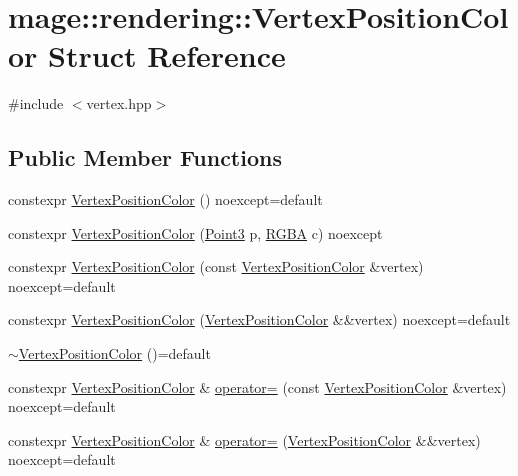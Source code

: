 \hypertarget{structmage_1_1rendering_1_1_vertex_position_color}{}\section{mage\+:\+:rendering\+:\+:Vertex\+Position\+Color Struct Reference}
\label{structmage_1_1rendering_1_1_vertex_position_color}


{\ttfamily \#include $<$vertex.\+hpp$>$}

\subsection*{Public Member Functions}
\begin{DoxyCompactItemize}
\item 
constexpr \hyperlink{structmage_1_1rendering_1_1_vertex_position_color_a2491463aecd8969ed33f85b41a0887c5}{Vertex\+Position\+Color} () noexcept=default
\item 
constexpr \hyperlink{structmage_1_1rendering_1_1_vertex_position_color_aee4b12660a3966ebbaf8235eadf0295a}{Vertex\+Position\+Color} (\hyperlink{structmage_1_1_point3}{Point3} p, \hyperlink{structmage_1_1_r_g_b_a}{R\+G\+BA} c) noexcept
\item 
constexpr \hyperlink{structmage_1_1rendering_1_1_vertex_position_color_a4722da066079b70dea70bf892b0652ad}{Vertex\+Position\+Color} (const \hyperlink{structmage_1_1rendering_1_1_vertex_position_color}{Vertex\+Position\+Color} \&vertex) noexcept=default
\item 
constexpr \hyperlink{structmage_1_1rendering_1_1_vertex_position_color_a28e3b4bc9f98e805fc2bfd0553876e15}{Vertex\+Position\+Color} (\hyperlink{structmage_1_1rendering_1_1_vertex_position_color}{Vertex\+Position\+Color} \&\&vertex) noexcept=default
\item 
\hyperlink{structmage_1_1rendering_1_1_vertex_position_color_a80120768659e011119843c29df379e13}{$\sim$\+Vertex\+Position\+Color} ()=default
\item 
constexpr \hyperlink{structmage_1_1rendering_1_1_vertex_position_color}{Vertex\+Position\+Color} \& \hyperlink{structmage_1_1rendering_1_1_vertex_position_color_a8fd53bb8cda2b18504a7dfd386e78463}{operator=} (const \hyperlink{structmage_1_1rendering_1_1_vertex_position_color}{Vertex\+Position\+Color} \&vertex) noexcept=default
\item 
constexpr \hyperlink{structmage_1_1rendering_1_1_vertex_position_color}{Vertex\+Position\+Color} \& \hyperlink{structmage_1_1rendering_1_1_vertex_position_color_afd66f27ff1c0a372f729960260b4decd}{operator=} (\hyperlink{structmage_1_1rendering_1_1_vertex_position_color}{Vertex\+Position\+Color} \&\&vertex) noexcept=default
\end{DoxyCompactItemize}

